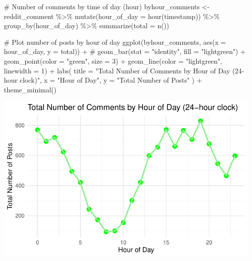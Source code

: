 \documentclass[
  letterpaper,
  DIV=11,
  numbers=noendperiod]{scrartcl}
\newenvironment{Shaded}{\begin{snugshade}}{\end{snugshade}}
\newcommand{\AttributeTok}[1]{\textcolor[rgb]{0.40,0.45,0.13}{#1}}
\newcommand{\CommentTok}[1]{\textcolor[rgb]{0.37,0.37,0.37}{#1}}
\newcommand{\DecValTok}[1]{\textcolor[rgb]{0.68,0.00,0.00}{#1}}
\newcommand{\FunctionTok}[1]{\textcolor[rgb]{0.28,0.35,0.67}{#1}}
\newcommand{\NormalTok}[1]{\textcolor[rgb]{0.00,0.23,0.31}{#1}}
\newcommand{\OtherTok}[1]{\textcolor[rgb]{0.00,0.23,0.31}{#1}}
\newcommand{\SpecialCharTok}[1]{\textcolor[rgb]{0.37,0.37,0.37}{#1}}
\newcommand{\StringTok}[1]{\textcolor[rgb]{0.13,0.47,0.30}{#1}}
\begin{document}
\begin{Shaded}
\begin{Highlighting}[]
\CommentTok{\# Number of comments by time of day (hour)}
\NormalTok{byhour\_comments }\OtherTok{\textless{}{-}}\NormalTok{ reddit\_comment }\SpecialCharTok{\%\textgreater{}\%}
  \FunctionTok{mutate}\NormalTok{(}\AttributeTok{hour\_of\_day =} \FunctionTok{hour}\NormalTok{(timestamp)) }\SpecialCharTok{\%\textgreater{}\%}
  \FunctionTok{group\_by}\NormalTok{(hour\_of\_day) }\SpecialCharTok{\%\textgreater{}\%}
  \FunctionTok{summarize}\NormalTok{(}\AttributeTok{total =} \FunctionTok{n}\NormalTok{())}

\CommentTok{\# Plot number of posts by hour of day}
\FunctionTok{ggplot}\NormalTok{(byhour\_comments, }\FunctionTok{aes}\NormalTok{(}\AttributeTok{x =}\NormalTok{ hour\_of\_day, }\AttributeTok{y =}\NormalTok{ total)) }\SpecialCharTok{+} 
  \CommentTok{\# geom\_bar(stat = "identity", fill = "lightgreen") + }
  \FunctionTok{geom\_point}\NormalTok{(}\AttributeTok{color =} \StringTok{"green"}\NormalTok{, }\AttributeTok{size =} \DecValTok{3}\NormalTok{) }\SpecialCharTok{+}  
  \FunctionTok{geom\_line}\NormalTok{(}\AttributeTok{color =} \StringTok{"lightgreen"}\NormalTok{, }\AttributeTok{linewidth =} \DecValTok{1}\NormalTok{) }\SpecialCharTok{+}
  \FunctionTok{labs}\NormalTok{(}
    \AttributeTok{title =} \StringTok{"Total Number of Comments by Hour of Day (24{-}hour clock)"}\NormalTok{,}
    \AttributeTok{x =} \StringTok{"Hour of Day"}\NormalTok{,}
    \AttributeTok{y =} \StringTok{"Total Number of Posts"}
\NormalTok{  ) }\SpecialCharTok{+}
  \FunctionTok{theme\_minimal}\NormalTok{()}
\end{Highlighting}
\end{Shaded}

\includegraphics{Reddit_eda_files/figure-pdf/unnamed-chunk-6-2.pdf}
\end{document}
